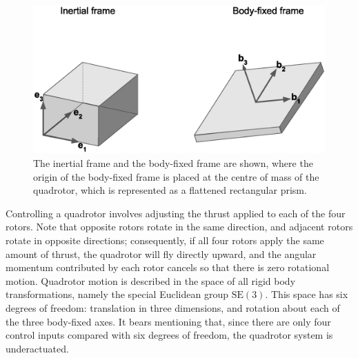 \begin{figure}[ht]
    \centering
    \includegraphics[scale=0.6]{./figures/frames2.eps}
    \caption[Inertial and body-fixed frames]{The inertial frame and the body-fixed frame are shown, where the origin of the body-fixed frame is placed at the centre of mass of the quadrotor, which is represented as a flattened rectangular prism.}
\label{fig:frames}
\end{figure}

Controlling a quadrotor involves adjusting the thrust applied to each of the four rotors. Note that opposite rotors rotate in the same direction, and adjacent rotors rotate in opposite directions; consequently, if all four rotors apply the same amount of thrust, the quadrotor will fly directly upward, and the angular momentum contributed by each rotor cancels so that there is zero rotational motion. Quadrotor motion is described in the space of all rigid body transformations, namely the special Euclidean group $\text{SE}(3)$. This space has six degrees of freedom: translation in three dimensions, and rotation about each of the three body-fixed axes. It bears mentioning that, since there are only four control inputs compared with six degrees of freedom, the quadrotor system is underactuated.

